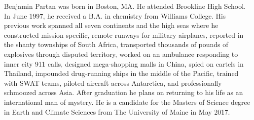 \begin{biography}			%
Benjamin Partan was born in Boston, MA. He attended Brookline High School. In June 1997, he received a B.A. in chemistry from Williams College. His previous work spanned all seven continents and the high seas where he constructed mission-specific, remote runways for military airplanes, reported in the shanty townships of South Africa, transported thousands of pounds of explosives through disputed territory, worked on an ambulance responding to inner city 911 calls, designed mega-shopping malls in China, spied on cartels in Thailand, impounded drug-running ships in the middle of the Pacific, trained with SWAT teams, piloted aircraft across Antarctica, and professionally schmoozed across Asia. After graduation he plans on returning to his life as an international man of mystery. He is a candidate for the Masters of Science degree in Earth and Climate Sciences from The University of Maine in May 2017. 
\end{biography}

\endinput